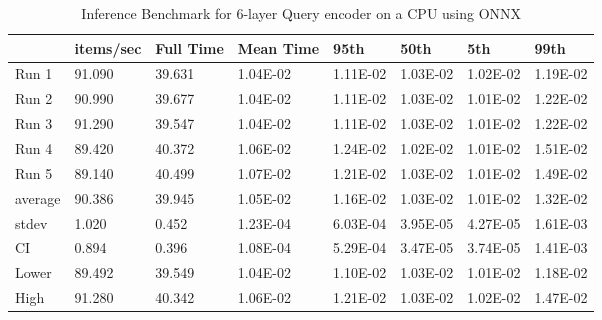 \begin{table*}[!ht]
    \centering
    \begin{tabular}{|l|l|l|l|l|l|l|l|}
    \hline
        ~ & items/sec & Full Time & Mean Time & 95th & 50th & 5th & 99th \\ \hline
        Run 1 & 91.090 & 39.631 & 1.04E-02 & 1.11E-02 & 1.03E-02 & 1.02E-02 & 1.19E-02 \\ \hline
        Run 2 & 90.990 & 39.677 & 1.04E-02 & 1.11E-02 & 1.03E-02 & 1.01E-02 & 1.22E-02 \\ \hline
        Run 3 & 91.290 & 39.547 & 1.04E-02 & 1.11E-02 & 1.03E-02 & 1.01E-02 & 1.22E-02 \\ \hline
        Run 4 & 89.420 & 40.372 & 1.06E-02 & 1.24E-02 & 1.02E-02 & 1.01E-02 & 1.51E-02 \\ \hline
        Run 5 & 89.140 & 40.499 & 1.07E-02 & 1.21E-02 & 1.03E-02 & 1.01E-02 & 1.49E-02 \\ \hline
        average & 90.386 & 39.945 & 1.05E-02 & 1.16E-02 & 1.03E-02 & 1.01E-02 & 1.32E-02 \\ \hline
        stdev & 1.020 & 0.452 & 1.23E-04 & 6.03E-04 & 3.95E-05 & 4.27E-05 & 1.61E-03 \\ \hline
        CI & 0.894 & 0.396 & 1.08E-04 & 5.29E-04 & 3.47E-05 & 3.74E-05 & 1.41E-03 \\ \hline
        Lower & 89.492 & 39.549 & 1.04E-02 & 1.10E-02 & 1.03E-02 & 1.01E-02 & 1.18E-02 \\ \hline
        High & 91.280 & 40.342 & 1.06E-02 & 1.21E-02 & 1.03E-02 & 1.02E-02 & 1.47E-02 \\ \hline
    \end{tabular}
    \caption{Inference Benchmark for 6-layer Query encoder on a CPU using ONNX}
    \label{tab:benchmark-cpu-6layer}
\end{table*}

